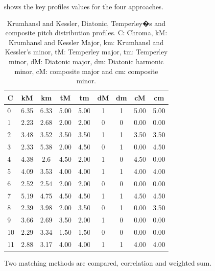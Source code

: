 \documentclass{article}
\begin{document}
 shows the key profiles values for the four approaches.



%                        

\begin{table}
 \begin{center}
 \begin{tabular}{|l|c|c|c|c|c|c|c|c|}
   \hline
  C			&	kM		&	km		&	tM		&	tm		&	dM	 &	dm	& 	cM		&	cm		\\
  \hline
  	0		&	6.35	&	6.33	&	5.00	&	5.00	&	1 	 &	1	&	5.00	&	5.00	\\
  	1		&	2.23	&	2.68	&	2.00	&	2.00	&	0	 &	0	&	0.00	&	0.00	\\
  	2		&	3.48	&	3.52	&	3.50	&	3.50	&	1	 &	1	&	3.50	&	3.50	\\  
  	3		&	2.33	&	5.38	&	2.00	&	4.50	&	0	 &	1	&	0.00	&	4.50	\\  
  	4		&	4.38	&	2.6		&	4.50	&	2.00	&	1	 &	0	&	4.50	&	0.00	\\
  	5		&	4.09	&	3.53	&	4.00	&	4.00	&	1	 &	1	&	4.00	&	4.00	\\
  	6		&	2.52	&	2.54	&	2.00	&	2.00	&	0	 &	0	&	0.00	&	0.00	\\  
  	7		&	5.19	&	4.75	&	4.50	&	4.50	&	1	 &	1	&	4.50	&	4.50	\\ 
  	8		&	2.39	&	3.98	&	2.00	&	3.50	&	0	 &	1	&	0.00	&	3.50	\\
  	9		&	3.66	&	2.69	&	3.50	&	2.00	&	1	 &	0	&	0.00	&	0.00	\\
  	10		&	2.29	&	3.34	&	1.50	&	1.50	&	0	 &	0	&	0.00	&	0.00	\\  
  	11		&	2.88	&	3.17	&	4.00	&	4.00	&	1	 &	1	&	4.00	&	4.00	\\ 	
  \hline
 \end{tabular}
\end{center}
 \caption{Krumhansl and Kessler, Diatonic, Temperley�s and composite pitch distribution profiles. C: Chroma, kM: Krumhansl and Kessler Major, km: Krumhansl and Kessler's minor, tM: Temperley major, tm: Temperley minor, dM: Diatonic major, dm: Diatonic harmonic minor, cM: composite major and cm: composite minor.}
 \label{tab:keyprofs}
\end{table}

Two matching methods are compared, correlation and weighted sum. %
%
\end{document}
